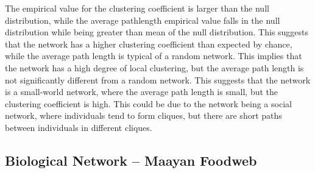 \documentclass[12pt]{article}
\begin{document}
The empirical value for the clustering coefficient is larger than the null distribution, while the average pathlength empirical value falls in the null distribution while being greater than mean of the null distribution. This suggests that the network has a higher clustering coefficient than expected by chance, while the average path length is typical of a random network. This implies that the network has a high degree of local clustering, but the average path length is not significantly different from a random network. This suggests that the network is a small-world network, where the average path length is small, but the clustering coefficient is high. This could be due to the network being a social network, where individuals tend to form cliques, but there are short paths between individuals in different cliques.


\subsection*{Biological Network -- Maayan Foodweb}
\end{document}
